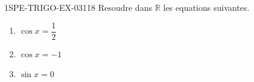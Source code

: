 \begin{exercice}{1SPE-TRIGO-EX-031}{1}{8}
Resoudre dans $\mathbb{R}$ les equations suivantes.
\begin{enumerate}
  \item $\cos x = \dfrac{1}{2}$
  \item $\cos x = -1$
  \item $\sin x = 0$
\end{enumerate}
\end{exercice}
